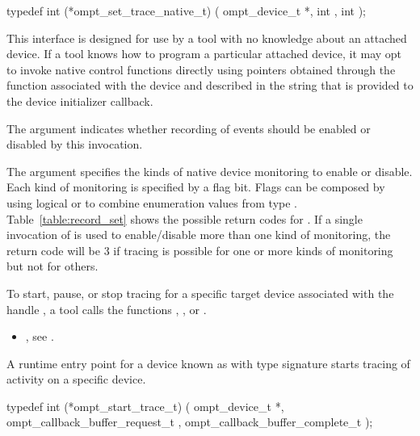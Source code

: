 \format
\begin{ccppspecific}
\begin{omptInquiry}
typedef int (*ompt_set_trace_native_t) (
  ompt_device_t *,
  int ,
  int 
);
\end{omptInquiry}
\end{ccppspecific}

\descr
This interface is designed for use by a tool with no knowledge about
an attached device. If a tool knows how to program a particular
attached device, it may opt to invoke native control functions
directly using pointers obtained through the  function
associated with the device and described in the 
string that is provided to the device initializer callback.

\argdesc
\devicedesc

The argument  indicates whether recording of events
should be enabled or disabled by this invocation.

The argument  specifies the kinds of native device
monitoring to enable or disable.
Each kind of monitoring is specified by a flag bit.
Flags can be composed by using logical {\ttfamily or}  to combine enumeration
values from type .
Table~\ref{table:record_set} shows the possible return codes for
.  If a single invocation of
 is used to enable/disable more
than one kind of monitoring, the return code will be 3 if tracing
is possible for one or more kinds of monitoring but not for others.

To start, pause, or stop tracing for a specific target device
associated with the handle , a tool calls the functions
, , or
.


\crossreferences
\begin{itemize}
\item {},
see .
\end{itemize}

\label{sec:ompt_start_trace_t}

\summary
A runtime entry point for a device known as 
with type signature 
starts tracing of activity on a specific device.

\format
\begin{ccppspecific}
\begin{omptInquiry}
typedef int (*ompt_start_trace_t) (
  ompt_device_t *,
  ompt_callback_buffer_request_t ,
  ompt_callback_buffer_complete_t 
);
\end{omptInquiry}
\end{ccppspecific}

